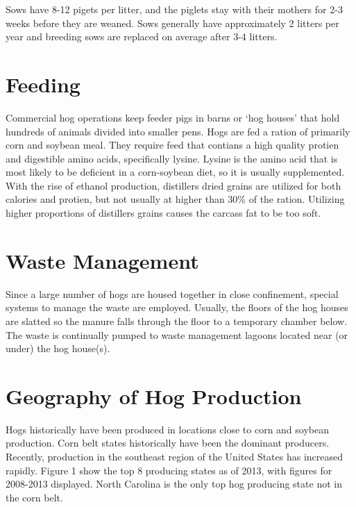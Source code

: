 \documentclass[
]{book}
\begin{document}
Sows have 8-12 pigets per litter, and the piglets stay with their mothers for 2-3 weeks before they are weaned. Sows generally have approximately 2 litters per year and breeding sows are replaced on average after 3-4 litters.

\hypertarget{feeding}{%
\section{Feeding}\label{feeding}}

Commercial hog operations keep feeder pigs in barns or `hog houses' that hold hundreds of animals divided into smaller pens. Hogs are fed a ration of primarily corn and soybean meal. They require feed that contians a high quality protien and digestible amino acids, specifically lysine. Lysine is the amino acid that is most likely to be deficient in a corn-soybean diet, so it is usually supplemented. With the rise of ethanol production, distillers dried grains are utilized for both calories and protien, but not usually at higher than 30\% of the ration. Utilizing higher proportions of distillers grains causes the carcass fat to be too soft.

\hypertarget{waste-management}{%
\section{Waste Management}\label{waste-management}}

Since a large number of hogs are housed together in close confinement, special systems to manage the waste are employed. Usually, the floors of the hog houses are slatted so the manure falls through the floor to a temporary chamber below. The waste is continually pumped to waste management lagoons located near (or under) the hog house(s).

\hypertarget{geography-of-hog-production}{%
\section{Geography of Hog Production}\label{geography-of-hog-production}}

Hogs historically have been produced in locations close to corn and soybean production. Corn belt states historically have been the dominant producers. Recently, production in the southeast region of the United States has increased rapidly. Figure 1 show the top 8 producing states as of 2013, with figures for 2008-2013 displayed. North Carolina is the only top hog producing state not in the corn belt.
\end{document}
